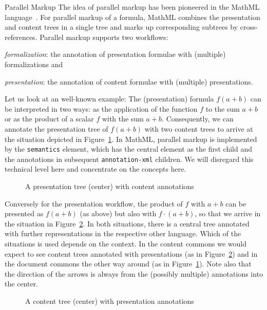 \begin{omgroup}{Parallel Markup}
  The idea of parallel markup has been pioneered in the MathML
  language~\cite{CarlisleEd:MathML3}. For parallel markup of a formula, MathML combines
  the presentation and content trees in a single \xml tree and marks up corresponding
  subtrees by cross-references. Parallel markup supports two workflows:
\begin{compactenum}
\item \emph{formalization}: the annotation of presentation formulae with (multiple)
  formalizations and
\item \emph{presentation}: the annotation of content formulae with (multiple)
  presentations.
\end{compactenum}
Let us look at an well-known example: The (presentation) formula $f(a+b)$ can be
interpreted in two ways: as the application of the function $f$ to the sum $a+b$ or as the
product of a scalar $f$ with the sum $a+b$. Consequently, we can annotate the presentation
tree of $f(a+b)$ with two content trees to arrive at the situation depicted in
Figure~\ref{fig:ptree-parallel}. In MathML, parallel markup is implemented by the
\lstinline|semantics| element, which has the central element as the first child and the
annotations in subsequent \lstinline|annotation-xml| children. We will disregard this
technical level here and concentrate on the concepts here.

\begin{figure}[ht]\centering
{}
\caption{A presentation tree (center) with content annotations}\label{fig:ptree-parallel}
\end{figure}

Conversely for the presentation workflow, the product of $f$ with $a+b$ can be presented
as $f(a+b)$ (as above) but also with $f\cdot(a+b)$, so that we arrive in the situation in
Figure~\ref{fig:ctree-parallel}.  In both situations, there is a central tree annotated
with further representations in the respective other language. Which of the situations is
used depends on the context. In the content commons we would expect to see content trees
annotated with presentations (as in Figure~\ref{fig:ctree-parallel}) and in the document
commons the other way around (as in Figure~\ref{fig:ptree-parallel}). Note also that the
direction of the arrows is always from the (possibly multiple) annotations into the
center.

\begin{figure}[ht]\centering
{}
\caption{A content tree (center) with presentation annotations}\label{fig:ctree-parallel}
\end{figure}
\end{omgroup}

